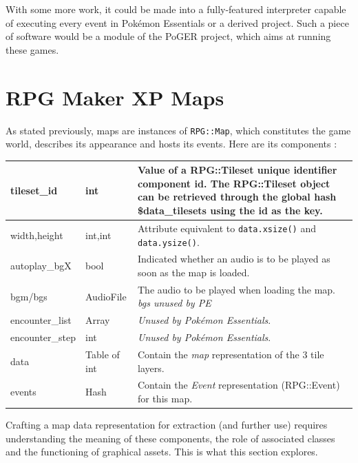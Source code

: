 \documentclass[11pt]{article}
\begin{document}
{With some more work, it could be made into a fully-featured interpreter capable of executing every event in Pokémon Essentials or a derived project. Such a piece of software would be a module of the PoGER project, which aims at running these games.



\newpage 
\section{RPG Maker XP Maps}

As stated previously, maps are instances of \verb|RPG::Map|, which constitutes the game world, describes its appearance and hosts its events. Here are its components :

{\small
\begin{tabular}{|a | l | l|}
	\hline
	{\ttfamily tileset\_id} & int & \parbox{.66\linewidth}{\vspace{.2\baselineskip}Value of a {\ttfamily RPG::Tileset} unique identifier component {\ttfamily id}. The {\ttfamily RPG::Tileset} object can be retrieved through the global hash {\ttfamily \$data\_tilesets} using the id as the key.} \\
	\hline
	{\ttfamily width,height} & int,int & Attribute equivalent to \verb|data.xsize()| and \verb|data.ysize()|. \\
	\hline
	{\ttfamily autoplay\_bgX} & bool & Indicated whether an audio is to be played as soon as the map is loaded. \\
	\hline
	{\ttfamily bgm/bgs} & AudioFile & The audio to be played when loading the map. \textit{bgs unused by PE} \\
	\hline
	{\ttfamily encounter\_list} & Array & \textit{Unused by Pokémon Essentials}. \\
	\hline
	{\ttfamily encounter\_step} & int & \textit{Unused by Pokémon Essentials}. \\
	\hline
	{\ttfamily data} & Table of int & Contain the \textit{map} representation of the 3 tile layers. \\
	\hline
	{\ttfamily events} & Hash & Contain the \textit{Event} representation ({\ttfamily RPG::Event}) for this map. \\
	\hline
\end{tabular}}

Crafting a map data representation for extraction (and further use) requires understanding the meaning of these components, the role of associated classes and the functioning of graphical assets. This is what this section explores.


}
\end{document}
